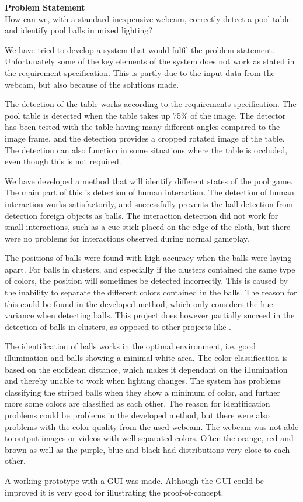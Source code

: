 \textbf{Problem Statement}\\
How can we, with a standard inexpensive webcam, correctly detect a pool table and identify pool balls in mixed lighting?

We have tried to develop a system that would fulfil the problem statement. Unfortunately some of the key elements of the system does not work as stated in the requirement specification. This is partly due to the input data from the webcam, but also because of the solutions made.

The detection of the table works according to the requirements specification. The pool table is detected when the table takes up 75\% of the image. The detector has been tested with the table having many different angles compared to the image frame, and the detection provides a cropped rotated image of the table. The detection can also function in some situations where the table is occluded, even though this is not required.

We have developed a method that will identify different states of the pool game. The main part of this is detection of human interaction. The detection of human interaction works satisfactorily, and successfully prevents the ball detection from detection foreign objects as balls. The interaction detection did not work for small interactions, such as a cue stick placed on the edge of the cloth, but there were no problems for interactions observed during normal gameplay.

The positions of balls were found with high accuracy when the balls were laying apart. For balls in clusters, and especially if the clusters contained the same type of colors, the position will sometimes be detected incorrectly. This is caused by the inability to separate the different colors contained in the balls. The reason for this could be found in the developed method, which only considers the hue variance when detecting balls. This project does however partially succeed in the detection of balls in clusters, as opposed to other projects like \cite{supportBilliard}.

The identification of balls works in the optimal environment, i.e. good illumination and balls showing a minimal white area. The color classification is based on the euclidean distance, which makes it dependant on the illumination and thereby unable to work when lighting changes.
The system has problems classifying the striped balls when they show a minimum of color, and further more some colors are classified as each other. The reason for identification problems could be problems in the developed method, but there were also problems with the color quality from the used webcam. The webcam was not able to output images or videos with well separated colors. Often the orange, red and brown as well as the purple, blue and black had distributions very close to each other.

A working prototype with a GUI was made. Although the GUI could be improved it is very good for illustrating the proof-of-concept.